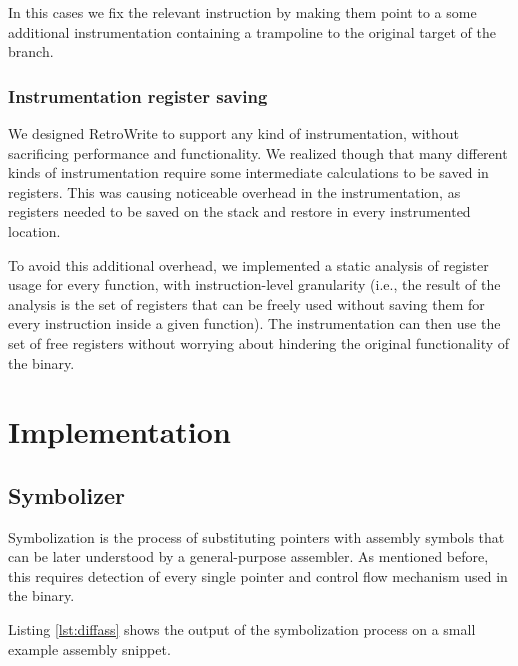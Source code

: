\documentclass[a4paper,11pt,oneside]{report}
\newcommand{\sysname}{RetroWrite\xspace}
\begin{document}
In this cases we fix the relevant instruction by making them point to a some 
additional instrumentation containing a trampoline to the original target of 
the branch. 




\subsection{Instrumentation register saving}

We designed \sysname to support any kind of instrumentation, without 
sacrificing performance and functionality. We realized though that many 
different kinds of instrumentation require some intermediate calculations to be 
saved in registers. This was causing noticeable overhead in the 
instrumentation, as registers needed to be saved on the stack and restore in 
every instrumented location. 

To avoid this additional overhead, we implemented a static analysis of register 
usage for every function, with instruction-level granularity (i.e., the result 
of the analysis is the set of registers that can be freely used without saving 
them for every instruction inside a given function). The instrumentation can 
then use the set of free registers without worrying about hindering the 
original functionality of the binary. 



\chapter{Implementation}



\section{Symbolizer}
Symbolization is the process of substituting pointers with assembly symbols that can be later understood by a general-purpose assembler. As mentioned before, this requires detection of every single pointer and control flow mechanism used in the binary. 

Listing \ref{lst:diffass}  shows the output of the symbolization process on a small example assembly snippet.
\end{document}

